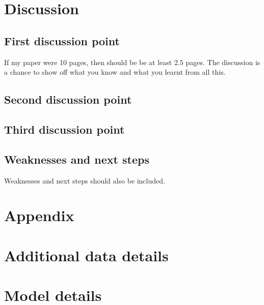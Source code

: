 \documentclass[
  letterpaper,
  DIV=11,
  numbers=noendperiod]{scrartcl}
\begin{document}
\hypertarget{discussion}{%
\section{Discussion}\label{discussion}}

\hypertarget{sec-first-point}{%
\subsection{First discussion point}\label{sec-first-point}}

If my paper were 10 pages, then should be be at least 2.5 pages. The
discussion is a chance to show off what you know and what you learnt
from all this.

\hypertarget{second-discussion-point}{%
\subsection{Second discussion point}\label{second-discussion-point}}

\hypertarget{third-discussion-point}{%
\subsection{Third discussion point}\label{third-discussion-point}}

\hypertarget{weaknesses-and-next-steps}{%
\subsection{Weaknesses and next steps}\label{weaknesses-and-next-steps}}

Weaknesses and next steps should also be included.

\newpage

\appendix

\hypertarget{appendix}{%
\section*{Appendix}\label{appendix}}

\hypertarget{additional-data-details}{%
\section{Additional data details}\label{additional-data-details}}

\hypertarget{sec-model-details}{%
\section{Model details}\label{sec-model-details}}
\end{document}
